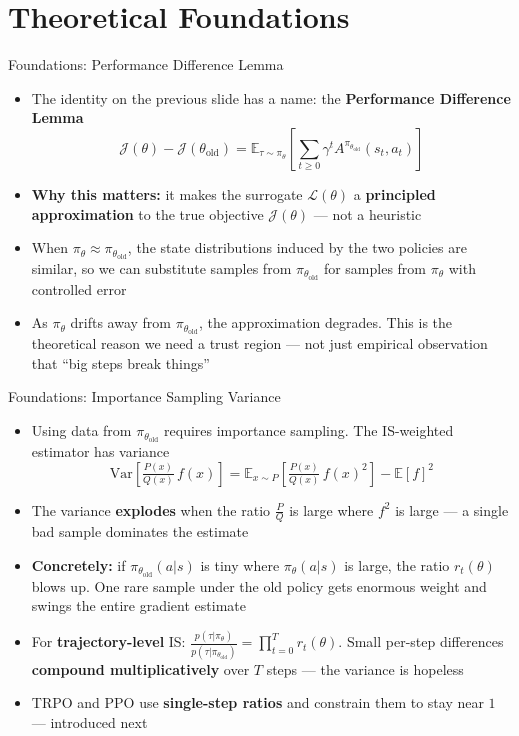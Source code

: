 \section{Theoretical Foundations}
\begin{frame}{Foundations: Performance Difference Lemma}
\begin{itemize}
    \item The identity on the previous slide has a name: the \textbf{Performance Difference Lemma}\footnotemark[1]
    $$\mathcal{J}(\theta) - \mathcal{J}(\theta_\text{old}) = \mathbb{E}_{\tau \sim \pi_\theta}\!\left[\sum_{t \geq 0} \gamma^t A^{\pi_{\theta_\text{old}}}(s_t, a_t)\right]$$
    \item \textbf{Why this matters:} it makes the surrogate $\mathcal{L}(\theta)$ a \textbf{principled approximation} to the true objective $\mathcal{J}(\theta)$ --- not a heuristic
    \item When $\pi_\theta \approx \pi_{\theta_\text{old}}$, the state distributions induced by the two policies are similar, so we can substitute samples from $\pi_{\theta_\text{old}}$ for samples from $\pi_\theta$ with controlled error
    \item As $\pi_\theta$ drifts away from $\pi_{\theta_\text{old}}$, the approximation degrades. This is the theoretical reason we need a trust region --- not just empirical observation that ``big steps break things''
\end{itemize}
\end{frame}

\begin{frame}{Foundations: Importance Sampling Variance}
\begin{itemize}
    \item Using data from $\pi_{\theta_\text{old}}$ requires importance sampling. The IS-weighted estimator has variance
    $$\mathrm{Var}\!\left[\tfrac{P(x)}{Q(x)}\, f(x)\right] = \mathbb{E}_{x \sim P}\!\left[\tfrac{P(x)}{Q(x)}\, f(x)^2\right] - \mathbb{E}[f]^2$$
    \item The variance \textbf{explodes} when the ratio $\tfrac{P}{Q}$ is large where $f^2$ is large --- a single bad sample dominates the estimate
    \item \textbf{Concretely:} if $\pi_{\theta_\text{old}}(a|s)$ is tiny where $\pi_\theta(a|s)$ is large, the ratio $r_t(\theta)$ blows up. One rare sample under the old policy gets enormous weight and swings the entire gradient estimate
    \pause
    \item For \textbf{trajectory-level} IS: $\frac{p(\tau|\pi_\theta)}{p(\tau|\pi_{\theta_\text{old}})} = \prod_{t=0}^{T} r_t(\theta)$. Small per-step differences \textbf{compound multiplicatively} over $T$ steps --- the variance is hopeless
    \item TRPO and PPO use \textbf{single-step ratios} and constrain them to stay near $1$ --- introduced next\footnotemark[2]
\end{itemize}
\end{frame}
